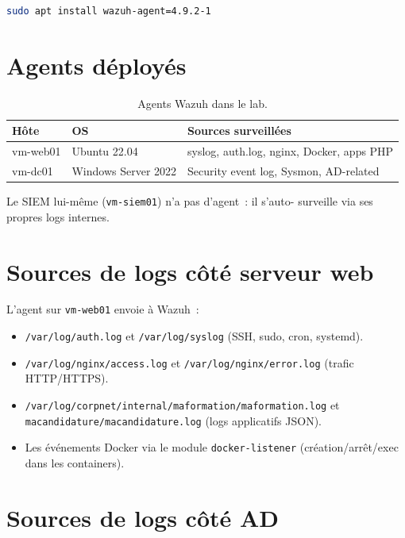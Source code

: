 \begin{lstlisting}[language=bash,caption={Installation d'un agent
sur Ubuntu.}]
sudo apt install wazuh-agent=4.9.2-1
\end{lstlisting}

\section{Agents déployés}

\begin{table}[h]
\centering
\caption{Agents Wazuh dans le lab.}
\label{tab:agents}
\small
\begin{tabular}{lll}
\toprule
\textbf{Hôte} & \textbf{OS} & \textbf{Sources surveillées} \\
\midrule
vm-web01 & Ubuntu 22.04 & syslog, auth.log, nginx, Docker, apps PHP \\
vm-dc01 & Windows Server 2022 & Security event log, Sysmon, AD-related \\
\bottomrule
\end{tabular}
\end{table}

Le SIEM lui-même (\texttt{vm-siem01}) n'a pas d'agent~: il s'auto-
surveille via ses propres logs internes.

\section{Sources de logs côté serveur web}

L'agent sur \texttt{vm-web01} envoie à Wazuh~:

\begin{itemize}
  \item \texttt{/var/log/auth.log} et \texttt{/var/log/syslog}
    (SSH, sudo, cron, systemd).
  \item \texttt{/var/log/nginx/access.log} et
    \texttt{/var/log/nginx/error.log} (trafic HTTP/HTTPS).
  \item \texttt{/var/log/corpnet/internal/maformation/maformation.log}
    et \texttt{macandidature/macandidature.log} (logs applicatifs
    JSON).
  \item Les événements Docker via le module
    \texttt{docker-listener} (création/arrêt/exec dans les
    containers).
\end{itemize}

\section{Sources de logs côté AD}

